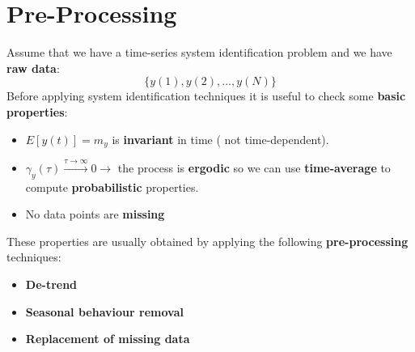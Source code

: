 \section{Pre-Processing}
Assume that we have a time-series system identification problem and we have \textbf{raw data}:
$$ \{y(1), y(2),...,y(N)\}$$
Before applying system identification techniques it is useful to check some \textbf{basic properties}:
\begin{itemize}
\item $E[y(t)]= m_y$ is \textbf{invariant} in time ( not time-dependent).
\item $\gamma_y(\tau) \xrightarrow[]{\tau \to \infty} 0 \to$ the process is \textbf{ergodic} so we can use \textbf{time-average} to compute \textbf{probabilistic} properties.
\item No data points are \textbf{missing}  
\end{itemize}
These properties are usually obtained by applying the following \textbf{pre-processing} techniques:
\begin{itemize}
\item \textbf{De-trend}
\item \textbf{Seasonal behaviour removal}
\item \textbf{Replacement of missing data}
\end{itemize}


